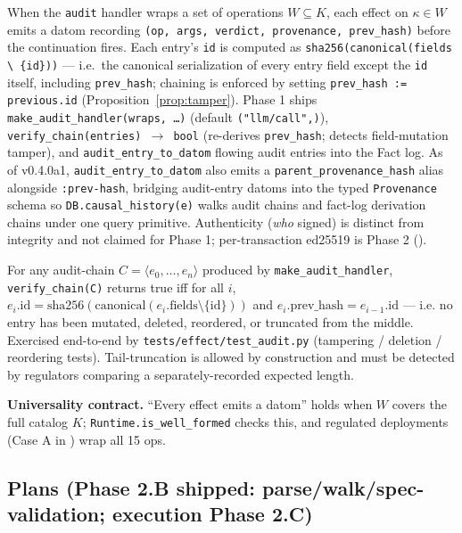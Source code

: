 \documentclass[anon]{nesy2026}   %
\newcommand{\C}[1]{\texttt{#1}}
\begin{document}
When the \C{audit} handler wraps a set of operations $W \subseteq K$, each effect on $\kappa \in W$ emits a datom recording \C{(op, args, verdict, provenance, prev\_hash)} before the continuation fires. Each entry's \C{id} is computed as \C{sha256(canonical(fields \textbackslash{} \{id\}))} --- i.e.\ the canonical serialization of every entry field except the \C{id} itself, including \C{prev\_hash}; chaining is enforced by setting \C{prev\_hash := previous.id} (Proposition~\ref{prop:tamper}). Phase 1 ships \C{make\_audit\_handler(wraps, \dots)} (default \C{("llm/call",)}), \C{verify\_chain(entries) $\to$ bool} (re-derives \C{prev\_hash}; detects field-mutation tamper), and \C{audit\_entry\_to\_datom} flowing audit entries into the Fact log. As of v0.4.0a1, \C{audit\_entry\_to\_datom} also emits a \C{parent\_provenance\_hash} alias alongside \C{:prev-hash}, bridging audit-entry datoms into the typed \C{Provenance} schema so \C{DB.causal\_history(e)} walks audit chains and fact-log derivation chains under one query primitive. Authenticity (\emph{who} signed) is distinct from integrity and not claimed for Phase 1; per-transaction ed25519 is Phase 2 ().

\begin{proposition}\label{prop:tamper}
For any audit-chain $C = \langle e_0, \dots, e_n \rangle$ produced by \C{make\_audit\_handler}, \C{verify\_chain(C)} returns true iff for all $i$, $e_i.\text{id} = \text{sha256}(\text{canonical}(e_i.\text{fields} \setminus \{\text{id}\}))$ and $e_i.\text{prev\_hash} = e_{i-1}.\text{id}$ --- i.e. no entry has been mutated, deleted, reordered, or truncated from the middle. Exercised end-to-end by \C{tests/effect/test\_audit.py} (tampering / deletion / reordering tests). Tail-truncation is allowed by construction and must be detected by regulators comparing a separately-recorded expected length.
\end{proposition}

\textbf{Universality contract.} ``Every effect emits a datom'' holds when $W$ covers the full catalog $K$; \C{Runtime.is\_well\_formed} checks this, and regulated deployments (Case A in ) wrap all 15 ops.

\subsection{Plans (Phase 2.B shipped: parse/walk/spec-validation; execution Phase 2.C)}\label{sec:plans}
\end{document}
